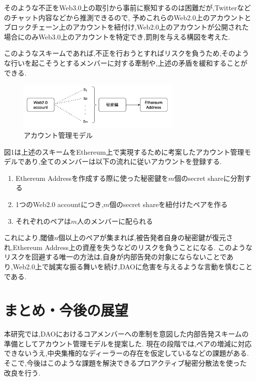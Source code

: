 \documentclass[43pt,twocolumn,a4j]{jarticle}
\begin{document}
そのような不正をWeb3.0上の取引から事前に察知するのは困難だが,Twitterなどのチャット内容などから推測できるので,
予めこれらのWeb2.0上のアカウントとブロックチェーン上のアカウントを紐付け,Web2.0上のアカウントが公開された場合にのみWeb3.0上のアカウントを特定でき,罰則を与える構図を考えた.

このようなスキームであれば,不正を行おうとすればリスクを負うため,そのような行いを起こそうとするメンバーに対する牽制や,上述の矛盾を緩和することができる.
\begin{figure}[htbp]
  \begin{center}
    \includegraphics[width=80mm]{share.png}
    \caption{アカウント管理モデル}
  \end{center}
\end{figure}
\vspace{-20pt}

図1は上述のスキームをEthereum上で実現するために考案したアカウント管理モデルであり,全てのメンバーは以下の流れに従いアカウントを登録する.
\begin{enumerate}
  \vspace{-5pt}
  \item Ethereum Addressを作成する際に使った秘密鍵を$m$個のsecret shareに分割する\vspace{-5pt}
  \item 1つのWeb2.0 accountにつき,$m$個のsecret shareを紐付けたペアを作る\vspace{-5pt}
  \item それぞれのペアは$m$人のメンバーに配られる\vspace{-5pt}
\end{enumerate}

これにより,閾値$n$個以上のペアが集まれば,被告発者自身の秘密鍵が復元され,Ethereum Address上の資産を失うなどのリスクを負うことになる.
このようなリスクを回避する唯一の方法は,自身が内部告発の対象にならないことであり,Web2.0上で誠実な振る舞いを続け,DAOに危害を与えるような言動を慎むことである.
\vspace{-20pt}

\section{\normalsize まとめ・今後の展望\vspace{-10pt}}
本研究では,DAOにおけるコアメンバーへの牽制を意図した内部告発スキームの準備としてアカウント管理モデルを提案した.
現在の段階では,ペアの増減に対応できないうえ,中央集権的なディーラーの存在を仮定しているなどの課題がある.そこで,今後はこのような課題を解決できるプロアクティブ秘密分散法を使った改良を行う.
\end{document}
